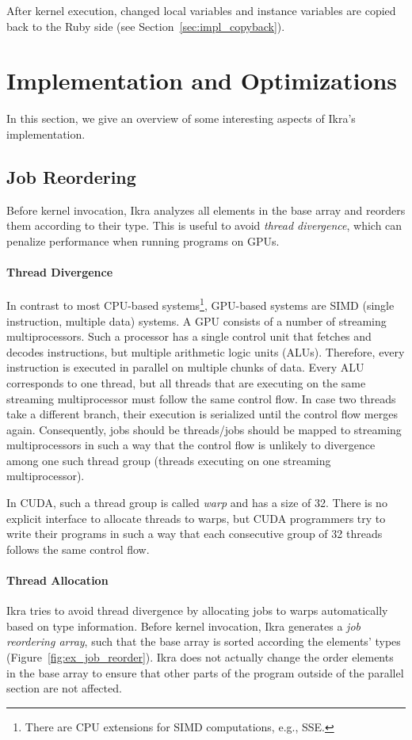 \documentclass[preprint]{sigplanconf}
\begin{document}
After kernel execution, changed local variables and instance variables are copied back to the Ruby side (see Section~\ref{sec:impl_copyback}).


\section{Implementation and Optimizations}
In this section, we give an overview of some interesting aspects of Ikra's implementation.

\subsection{Job Reordering}
Before kernel invocation, Ikra analyzes all elements in the base array and reorders them according to their type. This is useful to avoid \emph{thread divergence}, which can penalize performance when running programs on GPUs.

\paragraph{Thread Divergence}
In contrast to most CPU-based systems\footnote{There are CPU extensions for SIMD computations, e.g., SSE.}, GPU-based systems are SIMD (single instruction, multiple data) systems. A GPU consists of a number of streaming multiprocessors. Such a processor has a single control unit that fetches and decodes instructions, but multiple arithmetic logic units (ALUs). Therefore, every instruction is executed in parallel on multiple chunks of data. Every ALU corresponds to one thread, but all threads that are executing on the same streaming multiprocessor must follow the same control flow. In case two threads take a different branch, their execution is serialized until the control flow merges again. Consequently, jobs should be threads/jobs should be mapped to streaming multiprocessors in such a way that the control flow is unlikely to divergence among one such thread group (threads executing on one streaming multiprocessor).

In CUDA, such a thread group is called \emph{warp} and has a size of 32. There is no explicit interface to allocate threads to warps, but CUDA programmers try to write their programs in such a way that each consecutive group of 32 threads follows the same control flow.

\paragraph{Thread Allocation}
Ikra tries to avoid thread divergence by allocating jobs to warps automatically based on type information. Before kernel invocation, Ikra generates a \emph{job reordering array}, such that the base array is sorted according the elements' types (Figure~\ref{fig:ex_job_reorder}). Ikra does not actually change the order elements in the base array to ensure that other parts of the program outside of the parallel section are not affected.
\end{document}

